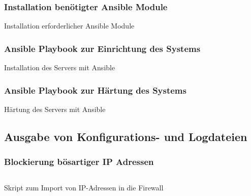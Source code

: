 \subsubsection{Installation benötigter Ansible Module}
\begin{listing}[ht]
    \caption{Installation erforderlicher Ansible Module}
    \label{listing:ansible_module_installation}
\end{listing}


\subsubsection{Ansible Playbook zur Einrichtung des Systems}
\begin{longlisting}
    \caption{Installation des Servers mit Ansible}
    \label{listing:ansible_playbook}
\end{longlisting}

\subsubsection{Ansible Playbook zur Härtung des Systems}
\begin{longlisting}
    \caption{Härtung des Servers mit Ansible}
    \label{listing:hardening}
\end{longlisting}

\subsection{Ausgabe von Konfigurations- und Logdateien}

\subsubsection{Blockierung bösartiger IP Adressen}\label{kap:fw_abuse}
\begin{longlisting}   
\inputminted[fontfamily=tt,
linenos=true,
numberblanklines=true,
numbersep=5pt,
gobble=0,
frame=leftline,
framerule=0.4pt,
framesep=2mm,
funcnamehighlighting=true,
tabsize=4,
obeytabs=false,
mathescape=false
samepage=false, %
showspaces=false,
showtabs =false,
texcl=false,
breaklines=true]{docker}{code/shell/fw_abuse.sh}
\caption{Skript zum Import von IP-Adressen in die Firewall}
\end{longlisting}

